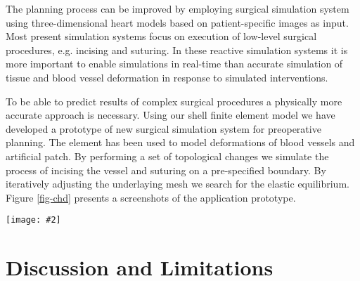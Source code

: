 \documentclass{egpubl}
\newcommand{\FigureW}[3]{%
\begin{figure*}[htb]
  \centering
  \texttt{[image: \#2]}
  \caption{\label{fig-#2}#3}
\end{figure*}}
\begin{document}
The planning process can be improved by employing surgical simulation system
using three-dimensional heart models based on patient-specific images as input.
Most present simulation systems focus on execution of low-level surgical
procedures, e.g. incising and suturing. In these reactive simulation systems it
is more important to enable simulations in real-time than accurate simulation
of tissue and blood vessel deformation in response to simulated interventions.

To be able to predict results of complex surgical procedures a physically more
accurate approach is necessary. Using our shell finite element model we have
developed a prototype \cite{Kislinskiy2012} of new surgical simulation system
for preoperative planning. The element has been used to model deformations of
blood vessels and artificial patch. By performing a set of topological changes
we simulate the process of incising the vessel and suturing on a pre-specified
boundary. By iteratively adjusting the underlaying mesh we search for the
elastic equilibrium. Figure \ref{fig-chd} presents a screenshots of the
application prototype.


%
%

\FigureW{0.75\linewidth}{chd}
{Screenshots of the simulation system prototype for different surgical
procedures used to repair a coarctation of an aortic arch. The screenshots
are enriched with overlay delineations.}




\section{Discussion and Limitations} %
\end{document}
